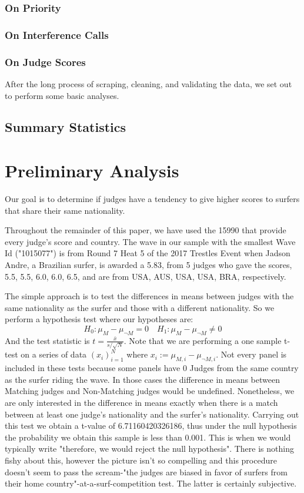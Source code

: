 \documentclass{article}
\begin{document}
\subsubsection{On Priority}
\subsubsection{On Interference Calls}
\subsubsection{On Judge Scores}

After the long process of scraping, cleaning, and validating the data, we set out to perform some basic analyses.

\subsection{Summary Statistics}

\section{Preliminary Analysis}
Our goal is to determine if judges have a tendency to give higher scores to surfers that share their same nationality.

Throughout the remainder of this paper, we have used the 15990 that provide every judge's score and country. The wave in our sample with the smallest Wave Id ("1015077") is from Round 7 Heat 5 of the 2017 Trestles Event when Jadson Andre, a Brazilian surfer, is awarded a 5.83, from 5 judges who gave the scores, 5.5, 5.5, 6.0, 6.0, 6.5, and are from USA, AUS, USA, USA, BRA, respectively.

The simple approach is to test the differences in means between judges with the same nationality as the surfer and those with a different nationality. So we perform a hypothesis test where our hypotheses are:
\[ H_0: \mu_M  - \mu_{\neg M} = 0  \quad H_1: \mu_M -\mu_{\neg M} \neq 0 \]
And the test statistic is $ t = \frac{\bar{x}}{s/\sqrt{N}} $. Note that we are performing a one sample t-test on a series of data $(x_i)_{i=1}^N$ where $x_i := \mu_{M,i}  - \mu_{\neg M,i}$.  Not every panel is included in these tests because some panels have 0 Judges from the same country as the surfer riding the wave. In those cases the difference in means between Matching judges and Non-Matching judges would be undefined. Nonetheless, we are only interested in the difference in means exactly when there is a match between at least one judge's nationality and the surfer's nationality. Carrying out this test we obtain a t-value of 6.71160420326186, thus under the null hypothesis the probability we obtain this sample is less than 0.001. This is when we would typically write "therefore, we would reject the null hypothesis". There is nothing fishy about this, however the picture isn't so compelling and this procedure doesn't seem to pass the scream-"the judges are biased in favor of surfers from their home country"-at-a-surf-competition test. The latter is certainly subjective.
\end{document}
